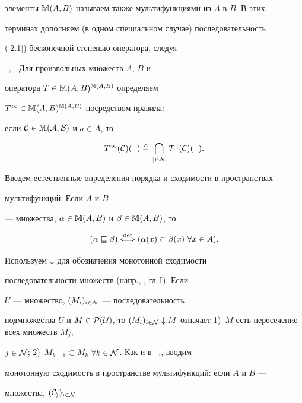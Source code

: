 элементы $\Bbb{M}(A,B)$ называем также мультифункциями из $A$ в $B$. В этих


терминах дополняем (в одном специальном случае) последовательность


(\ref{2.1}) бесконечной степенью оператора, следуя


\cite{23}--\cite{26}, \cite{55}. Для произвольных множеств $A$, $B$ и


оператора $T \in \Bbb{M}(A,B)^{\Bbb{M}(A,B)}$ определяем


$T^\infty \in \Bbb{M}(A,B)^{\Bbb{M}(A,B)}$ посредством правила:


если $\cal{C} \in \Bbb{M}(A,B)$ и $a \in A$, то


$$


{T^\infty}(\cal{C})(a) \triangleq \bigcap\limits_{k \in


{\cal{N}_0}}{T^k}(\cal{C})(a).


$$


Введем естественные определения порядка и сходимости в пространствах 


мультифункций. Если $A$ и $B$


--- множества, $\alpha \in \Bbb{M}(A,B)$ и $\beta \in


\Bbb{M}(A,B)$, то


\begin{equation}\label{2.2}


(\alpha \sqsubseteq \beta) \overset{\mathrm{def}}{\Longleftrightarrow}{}


({\alpha}(x) \subset{\beta}(x) \ \fo{x} \in A).


\end{equation}


Используем $\downarrow$ для обозначения монотонной сходимости


последовательности множеств (напр., \cite{56}, гл.\,I). Если


$U$ --- множество, $(M_i)_{i \in \cal{N}}$ --- последовательность


подмножества $U$ и $M \in \cal{P}(U)$, то $(M_i)_{i \in \cal{N}} \dow


M$ означает 1)~$M$ есть пересечение всех множеств ${M_j}$,


$j\in \cal{N}$; 2)~${M_{k+1}} \subset {M_k}$ \; $\fo{k} \in


\cal{N}$. Как и в \cite{23}--\cite{26},\cite{55}, вводим


монотонную сходимость в пространстве мультифункций: если $A$ и $B$ ---


множества, $(\cal{C}_i)_{i \in \cal{N}}$ ---


